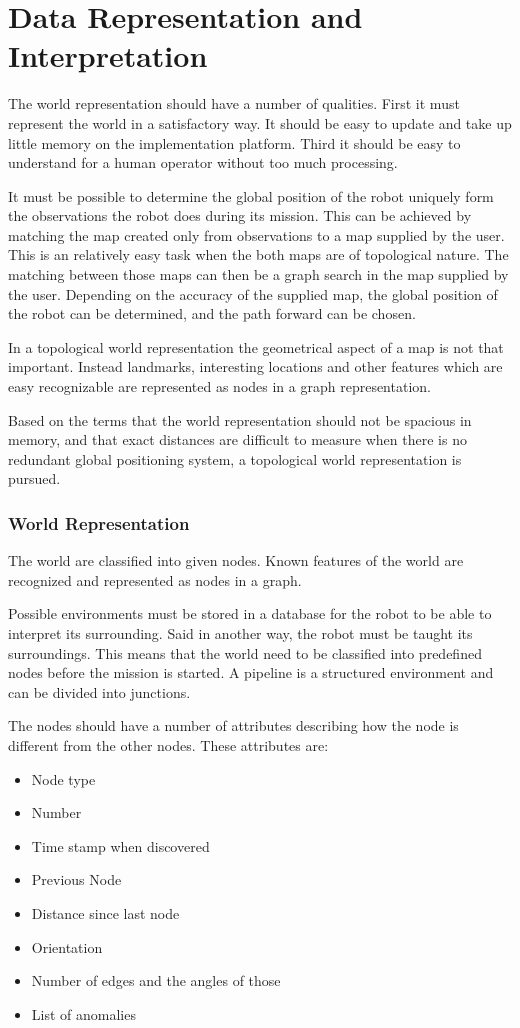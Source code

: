 

\chapter{Data Representation and Interpretation}
\label{chap5}
The world representation should have a number of qualities. First it must represent the
world in a satisfactory way. It should be easy to update and take up little memory on the
implementation platform. Third it should be easy to understand for a human operator
without too much processing. 

It must be possible to determine the global position of the robot uniquely form the
observations the robot does during its mission. This can be achieved by matching the map
created only from observations to a map supplied by the user. This is an relatively easy
task when the both maps are of topological nature. The matching between those maps can
then be a graph search in the map supplied by the user. Depending on the accuracy of the
supplied map, the global position of the robot can be determined, and the path forward can
be chosen. 

In a topological world representation the geometrical aspect of a map is not that
important. Instead landmarks, interesting locations and other features which are easy 
recognizable are represented as nodes in a graph representation. 

Based on the terms that the world representation should not be spacious in memory, and
that exact distances are difficult to measure when there is no redundant global positioning
system, a topological world representation is pursued. 


\subsection{World Representation}
The world are classified into given nodes. Known features of the world are recognized
and represented as nodes in a graph. 

Possible environments must be stored in a database for the robot to be able to interpret
its surrounding. Said in another way, the robot must be taught its surroundings. 
This means that the world need to be classified into predefined nodes before the mission
is started. A pipeline is a structured environment and can be divided into junctions. 

The nodes should have a number of attributes describing how the node is different from the
other nodes. These attributes are:
\begin{itemize}
    \item Node type
    \item Number
    \item Time stamp when discovered
    \item Previous Node
    \item Distance since last node
    \item Orientation
    \item Number of edges and the angles of those
    \item List of anomalies
\end{itemize}

